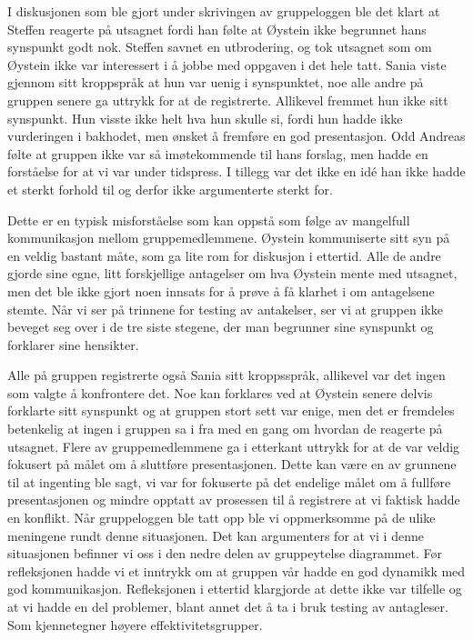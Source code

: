 \documentclass[a4paper,norsk,oneside]{article}
\begin{document}
I diskusjonen som ble gjort under skrivingen av gruppeloggen ble det klart at Steffen reagerte på utsagnet fordi han følte at Øystein ikke begrunnet hans synspunkt godt nok. Steffen savnet en utbrodering, og tok utsagnet som om Øystein ikke var interessert i å jobbe med oppgaven i det hele tatt. Sania viste gjennom sitt kroppspråk at hun var uenig i synspunktet, noe alle andre på gruppen senere ga uttrykk for at de registrerte. Allikevel fremmet hun ikke sitt synspunkt. Hun visste ikke helt hva hun skulle si, fordi hun hadde ikke vurderingen i bakhodet, men ønsket å fremføre en god presentasjon. Odd Andreas følte at gruppen ikke var så imøtekommende til hans forslag, men hadde en forståelse for at vi var under tidspress. I tillegg var det ikke en idé han ikke hadde et sterkt forhold til og derfor ikke argumenterte sterkt for.

Dette er en typisk misforståelse som kan oppstå som følge av mangelfull kommunikasjon mellom gruppemedlemmene. Øystein kommuniserte sitt syn på en veldig bastant måte, som ga lite rom for diskusjon i ettertid. Alle de andre gjorde sine egne, litt forskjellige antagelser om hva Øystein mente med utsagnet, men det ble ikke gjort noen innsats for å prøve å få klarhet i om antagelsene stemte. Når vi ser på trinnene for testing av antakelser, ser vi at gruppen ikke beveget seg over i de tre siste stegene, der man begrunner sine synspunkt og forklarer sine hensikter.

Alle på gruppen registrerte også Sania sitt kroppsspråk, allikevel var det ingen som valgte å konfrontere det. Noe kan forklares ved at Øystein senere delvis forklarte sitt synspunkt og at gruppen stort sett var enige, men det er fremdeles betenkelig at ingen i gruppen sa i fra med en gang om hvordan de reagerte på utsagnet. Flere av gruppemedlemmene ga i etterkant uttrykk for at de var veldig fokusert på målet om å sluttføre presentasjonen. Dette kan være en av grunnene til at ingenting ble sagt, vi var for fokuserte på det endelige målet om å fullføre presentasjonen og mindre opptatt av prosessen til å registrere at vi faktisk hadde en konflikt. Når gruppeloggen ble tatt opp ble vi oppmerksomme på de ulike meningene rundt denne situasjonen. Det kan argumenters for at vi i denne situasjonen befinner vi oss i den nedre delen av gruppeytelse diagrammet. Før refleksjonen hadde vi et inntrykk om at gruppen vår hadde en god dynamikk med god kommunikasjon. Refleksjonen i ettertid klargjorde at dette ikke var tilfelle og at vi hadde en del problemer, blant annet det å ta i bruk testing av antagleser. Som kjennetegner høyere effektivitetsgrupper.
\end{document}

